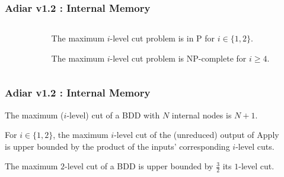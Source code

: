 \documentclass[english, aspectratio=169]{beamer}
\begin{document}
\begin{frame}
  \frametitle{Adiar v1.2 : Internal Memory}

  \begin{columns}
    \begin{column}{0.55\textwidth}
      \begin{definition}
        \begin{tikzpicture}[scale=0.9]
          
        \end{tikzpicture}
      \end{definition}
    \end{column}
    \begin{column}{0.44\textwidth}
       {
        \begin{lemma}
          The maximum $i$-level cut problem is in P for $i \in \{ 1,2 \}$.
        \end{lemma}
      }

       {
        \begin{theorem}
          The maximum $i$-level cut problem is NP-complete for $i \geq 4$.
        \end{theorem}
      }
    \end{column}
  \end{columns}
\end{frame}

\begin{frame}
  \frametitle{Adiar v1.2 : Internal Memory}

   {
    \begin{theorem}
      The maximum ($i$-level) cut of a BDD with $N$ internal nodes is $N+1$.
    \end{theorem}
  }

   {
    \begin{theorem}
      For $i \in \{ 1,2 \}$, the maximum $i$-level cut of the (unreduced) output
      of Apply\\is upper bounded by the product of the inputs' corresponding
      $i$-level cuts.
    \end{theorem}
  }

   {
    \begin{lemma}
      The maximum $2$-level cut of a BDD is upper bounded by $\tfrac{3}{2}$ its
      $1$-level cut.
    \end{lemma}
  }
\end{frame}
\end{document}
